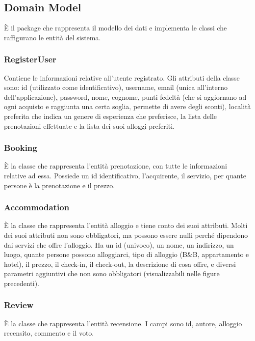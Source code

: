 \documentclass[10pt]{article}
\begin{document}
\subsection{Domain Model}

\`E il package che rappresenta il modello dei dati e implementa le classi che raffigurano le entità del sistema.

\subsubsection{RegisterUser}

Contiene le informazioni relative all'utente registrato. Gli attributi della classe sono: id (utilizzato come identificativo), username, email (unica all'interno dell'applicazione), password, nome, cognome, punti fedeltà (che si aggiornano ad ogni acquisto e raggiunta una certa soglia, permette di avere degli sconti), località preferita che indica un genere di esperienza che preferisce, la lista delle prenotazioni effettuate e la lista dei suoi alloggi preferiti. 

\subsubsection{Booking}

\`E la classe che rappresenta l'entità prenotazione, con tutte le informazioni relative ad essa. Possiede un id identificativo, l'acquirente, il servizio, per quante persone è la prenotazione e il prezzo.

\subsubsection{Accommodation}

\`E la classe che rappresenta l'entità alloggio e tiene conto dei suoi attributi. Molti dei suoi attributi non sono obbligatori, ma possono essere nulli perché dipendono dai servizi che offre l'alloggio. Ha un id (univoco), un nome, un indirizzo, un luogo, quante persone possono alloggiarci, tipo di alloggio (B\&B, appartamento e hotel), il prezzo, il check-in, il check-out, la descrizione di cosa offre, e diversi parametri aggiuntivi che non sono obbligatori (visualizzabili nelle figure precedenti).

\subsubsection{Review}

\`E la classe che rappresenta l'entità recensione. I campi sono id, autore, alloggio recensito, commento e il voto.
\end{document}
